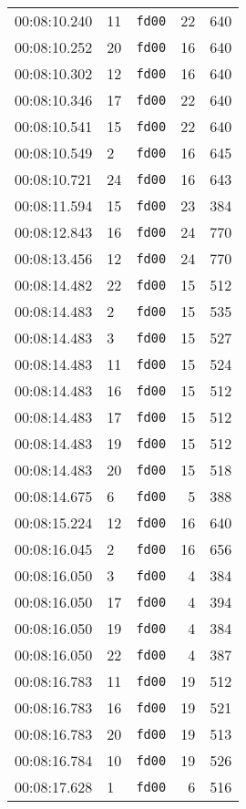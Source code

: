 \documentclass{article}
\begin{document}
\begin{longtable}{lllrr}
00:08:10.240 & 11 & \texttt{fd00} & 22 & 640 \\
00:08:10.252 & 20 & \texttt{fd00} & 16 & 640 \\
00:08:10.302 & 12 & \texttt{fd00} & 16 & 640 \\
00:08:10.346 & 17 & \texttt{fd00} & 22 & 640 \\
00:08:10.541 & 15 & \texttt{fd00} & 22 & 640 \\
00:08:10.549 & 2 & \texttt{fd00} & 16 & 645 \\
00:08:10.721 & 24 & \texttt{fd00} & 16 & 643 \\
00:08:11.594 & 15 & \texttt{fd00} & 23 & 384 \\
00:08:12.843 & 16 & \texttt{fd00} & 24 & 770 \\
00:08:13.456 & 12 & \texttt{fd00} & 24 & 770 \\
00:08:14.482 & 22 & \texttt{fd00} & 15 & 512 \\
00:08:14.483 & 2 & \texttt{fd00} & 15 & 535 \\
00:08:14.483 & 3 & \texttt{fd00} & 15 & 527 \\
00:08:14.483 & 11 & \texttt{fd00} & 15 & 524 \\
00:08:14.483 & 16 & \texttt{fd00} & 15 & 512 \\
00:08:14.483 & 17 & \texttt{fd00} & 15 & 512 \\
00:08:14.483 & 19 & \texttt{fd00} & 15 & 512 \\
00:08:14.483 & 20 & \texttt{fd00} & 15 & 518 \\
00:08:14.675 & 6 & \texttt{fd00} & 5 & 388 \\
00:08:15.224 & 12 & \texttt{fd00} & 16 & 640 \\
00:08:16.045 & 2 & \texttt{fd00} & 16 & 656 \\
00:08:16.050 & 3 & \texttt{fd00} & 4 & 384 \\
00:08:16.050 & 17 & \texttt{fd00} & 4 & 394 \\
00:08:16.050 & 19 & \texttt{fd00} & 4 & 384 \\
00:08:16.050 & 22 & \texttt{fd00} & 4 & 387 \\
00:08:16.783 & 11 & \texttt{fd00} & 19 & 512 \\
00:08:16.783 & 16 & \texttt{fd00} & 19 & 521 \\
00:08:16.783 & 20 & \texttt{fd00} & 19 & 513 \\
00:08:16.784 & 10 & \texttt{fd00} & 19 & 526 \\
00:08:17.628 & 1 & \texttt{fd00} & 6 & 516 \\

\end{longtable}
\end{document}
